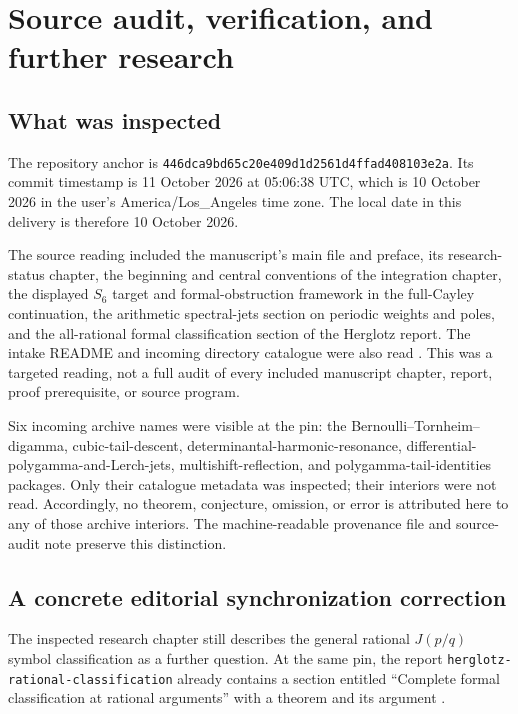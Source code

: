 \documentclass[11pt,letterpaper]{article}
\numberwithin{equation}{section}
\theoremstyle{definition}
\newcommand{\qfile}[1]{\nolinkurl{#1}}
\newcommand{\qpin}{\nolinkurl{446dca9bd65c20e409d1d2561d4ffad408103e2a}}
\begin{document}

\section{Source audit, verification, and further research}
\label{qspec:sec:audit}

\subsection{What was inspected}
The repository anchor is \qpin. Its commit timestamp is
11 October 2026 at 05:06:38 UTC, which is 10 October 2026 in the user's
America/Los\_Angeles time zone. The local date in this delivery is therefore
10 October 2026.

The source reading included the manuscript's main file and preface, its
research-status chapter, the beginning and central conventions of the
integration chapter, the displayed $S_6$ target and formal-obstruction
framework in the full-Cayley continuation, the arithmetic spectral-jets
section on periodic weights and poles, and the all-rational formal
classification section of the Herglotz report. The intake README and
incoming directory catalogue were also read \cite{repo,arithmetic,classification,intake}.
This was a targeted reading, not a full audit of every included manuscript
chapter, report, proof prerequisite, or source program.

Six incoming archive names were visible at the pin: the Bernoulli--Tornheim--
digamma, cubic-tail-descent, determinantal-harmonic-resonance,
differential-polygamma-and-Lerch-jets, multishift-reflection, and
polygamma-tail-identities packages. Only their catalogue metadata was
inspected; their interiors were not read. Accordingly, no theorem,
conjecture, omission, or error is attributed here to any of those archive
interiors. The machine-readable provenance file and source-audit note
preserve this distinction.

\subsection{A concrete editorial synchronization correction}
The inspected research chapter still describes the general rational
$J(p/q)$ symbol classification as a further question. At the same pin,
the report \qfile{herglotz-rational-classification} already contains a
section entitled ``Complete formal classification at rational arguments''
with a theorem and its argument \cite{classification}.
\end{document}
